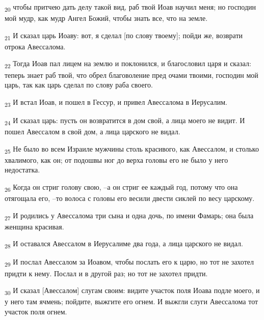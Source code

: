 \begin{tcolorbox}
\textsubscript{20} чтобы притчею дать делу такой вид, раб твой Иоав научил меня; но господин мой мудр, как мудр Ангел Божий, чтобы знать все, что на земле.
\end{tcolorbox}
\begin{tcolorbox}
\textsubscript{21} И сказал царь Иоаву: вот, я сделал [по слову твоему]; пойди же, возврати отрока Авессалома.
\end{tcolorbox}
\begin{tcolorbox}
\textsubscript{22} Тогда Иоав пал лицем на землю и поклонился, и благословил царя и сказал: теперь знает раб твой, что обрел благоволение пред очами твоими, господин мой царь, так как царь сделал по слову раба своего.
\end{tcolorbox}
\begin{tcolorbox}
\textsubscript{23} И встал Иоав, и пошел в Гессур, и привел Авессалома в Иерусалим.
\end{tcolorbox}
\begin{tcolorbox}
\textsubscript{24} И сказал царь: пусть он возвратится в дом свой, а лица моего не видит. И пошел Авессалом в свой дом, а лица царского не видал.
\end{tcolorbox}
\begin{tcolorbox}
\textsubscript{25} Не было во всем Израиле мужчины столь красивого, как Авессалом, и столько хвалимого, как он; от подошвы ног до верха головы его не было у него недостатка.
\end{tcolorbox}
\begin{tcolorbox}
\textsubscript{26} Когда он стриг голову свою, --а он стриг ее каждый год, потому что она отягощала его, --то волоса с головы его весили двести сиклей по весу царскому.
\end{tcolorbox}
\begin{tcolorbox}
\textsubscript{27} И родились у Авессалома три сына и одна дочь, по имени Фамарь; она была женщина красивая.
\end{tcolorbox}
\begin{tcolorbox}
\textsubscript{28} И оставался Авессалом в Иерусалиме два года, а лица царского не видал.
\end{tcolorbox}
\begin{tcolorbox}
\textsubscript{29} И послал Авессалом за Иоавом, чтобы послать его к царю, но тот не захотел придти к нему. Послал и в другой раз; но тот не захотел придти.
\end{tcolorbox}
\begin{tcolorbox}
\textsubscript{30} И сказал [Авессалом] слугам своим: видите участок поля Иоава подле моего, и у него там ячмень; пойдите, выжгите его огнем. И выжгли слуги Авессалома тот участок поля огнем.
\end{tcolorbox}
